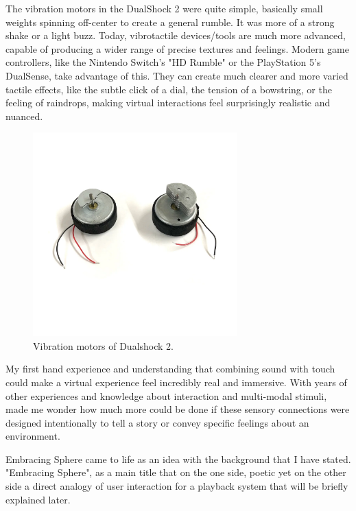     The vibration motors in the DualShock 2 were quite simple, basically small weights spinning off-center to create a general rumble. It was more of a strong shake or a light buzz\cite{PlayStation_Blogpost}. Today, vibrotactile devices/tools are much more advanced, capable of producing a wider range of precise textures and feelings. Modern game controllers, like the Nintendo Switch's "HD Rumble" or the PlayStation 5's DualSense, take advantage of this. They can create much clearer and more varied tactile effects, like the subtle click of a dial, the tension of a bowstring, or the feeling of raindrops, making virtual interactions feel surprisingly realistic and nuanced.

    \begin{figure}[H]
    \centering
    \includegraphics[width=0.7\textwidth]{images/vibration_motors_ds2}
    \caption{Vibration motors of Dualshock 2.}
    \end{figure}

    My first hand experience and understanding that combining sound with touch could make a virtual experience feel incredibly real and immersive. With years of other experiences and knowledge about interaction and multi-modal stimuli, made me wonder how much more could be done if these sensory connections were designed intentionally to tell a story or convey specific feelings about an environment.\par

    Embracing Sphere came to life as an idea with the background that I have stated. "Embracing Sphere", as a main title that on the one side, poetic yet on the other side a direct analogy of user interaction for a playback system that will be briefly explained later.\par
    
